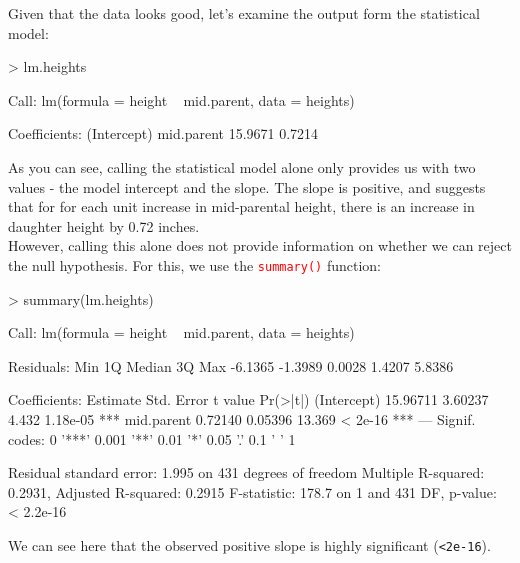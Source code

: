\documentclass[a4paper,12pt]{article}
\newcommand\code[1]{\textcolor{red}{\texttt{#1}}}
\begin{document}
Given that the data looks good, let's examine the output form the statistical model:

\begin{shaded}
\begin{Schunk}
\begin{Sinput}
> lm.heights
\end{Sinput}
\begin{Soutput}
Call:
lm(formula = height ~ mid.parent, data = heights)

Coefficients:
(Intercept)   mid.parent  
    15.9671       0.7214  
\end{Soutput}
\end{Schunk}
\end{shaded}

As you can see, calling the statistical model alone only provides us with two values - the model intercept and the slope. The slope is positive, and suggests that for for each unit increase in mid-parental height, there is an increase in daughter height by 0.72 inches.\\

However, calling this alone does not provide information on whether we can reject the null hypothesis. For this, we use the \code{summary()} function:

\begin{shaded}
\begin{Schunk}
\begin{Sinput}
> summary(lm.heights)
\end{Sinput}
\begin{Soutput}
Call:
lm(formula = height ~ mid.parent, data = heights)

Residuals:
    Min      1Q  Median      3Q     Max 
-6.1365 -1.3989  0.0028  1.4207  5.8386 

Coefficients:
            Estimate Std. Error t value Pr(>|t|)    
(Intercept) 15.96711    3.60237   4.432 1.18e-05 ***
mid.parent   0.72140    0.05396  13.369  < 2e-16 ***
---
Signif. codes:  0 '***' 0.001 '**' 0.01 '*' 0.05 '.' 0.1 ' ' 1

Residual standard error: 1.995 on 431 degrees of freedom
Multiple R-squared:  0.2931,	Adjusted R-squared:  0.2915 
F-statistic: 178.7 on 1 and 431 DF,  p-value: < 2.2e-16
\end{Soutput}
\end{Schunk}
\end{shaded}

We can see here that the observed positive slope is highly significant (\texttt{\textless 2e-16}). \\
\end{document}
